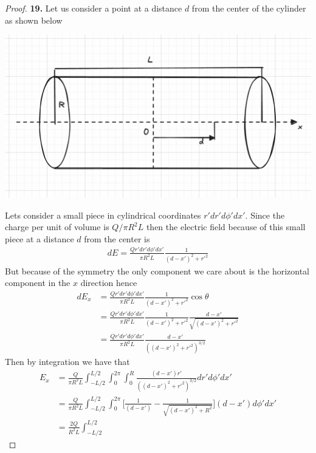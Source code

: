 \documentclass[11pt]{article}
\theoremstyle{definition}
\begin{document}
\cleardoublepage
\begin{proof}{\textbf{19.}}
    Let us consider a point at a distance $d$ from the center of the cylinder
    as shown below
    \begin{center}
        \includegraphics[scale=0.4]{ch2-19.png}
    \end{center}    
    Lets consider a small piece in cylindrical coordinates $r'dr'd\phi'dx'$.
    Since the charge per unit of volume is $Q/\pi R^2 L$
    then the electric field because of this small piece at a distance $d$
    from the center is
    \begin{align*}
        dE = \frac{Qr'dr'd\phi'dx'}{\pi R^2 L} \frac{1}{(d - x')^2 + r'^2}
    \end{align*}
    But because of the symmetry the only component we care about is the 
    horizontal component in the $x$ direction hence
    \begin{align*}
        dE_x
        &= \frac{Qr'dr'd\phi'dx'}{\pi R^2 L}
        \frac{1}{(d - x')^2 + r'^2} \cos\theta\\
        &= \frac{Qr'dr'd\phi'dx'}{\pi R^2 L}
        \frac{1}{(d - x')^2 + r'^2}\frac{d-x'}{\sqrt{(d - x')^2 + r'^2}}\\
        &= \frac{Qr'dr'd\phi'dx'}{\pi R^2 L}
        \frac{d-x'}{((d - x')^2 + r'^2)^{3/2}}
    \end{align*}
    Then by integration we have that
    \begin{align*}
        E_x &= \frac{Q}{\pi R^2 L}\int_{-L/2}^{L/2}\int_0^{2\pi}\int_0^R
        \frac{(d-x')r'}{((d - x')^2 + r'^2)^{3/2}} dr'd\phi'dx'\\
        &= \frac{Q}{\pi R^2 L}\int_{-L/2}^{L/2}\int_0^{2\pi}
        \bigg[\frac{1}{(d-x')}-\frac{1}{\sqrt{(d-x')^2 + R^2}}\bigg]
        (d-x')d\phi'dx'\\
        &= \frac{2Q}{R^2 L}\int_{-L/2}^{L/2}

\end{align*}
\end{proof}
\end{document}
